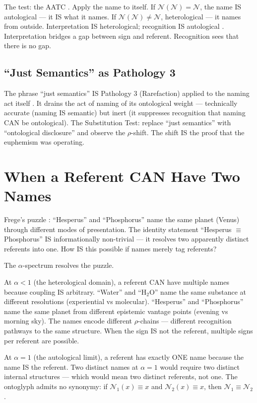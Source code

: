 \documentclass[11pt, oneside]{article}
\theoremstyle{definition}
\begin{document}
The test: the AATC \cite{codex1}. Apply the name to itself. If $\mathcal{N}(\mathcal{N}) = \mathcal{N}$, the name IS autological --- it IS what it names. If $\mathcal{N}(\mathcal{N}) \neq \mathcal{N}$, heterological --- it names from outside. Interpretation IS heterological; recognition IS autological \cite{codex2}. Interpretation bridges a gap between sign and referent. Recognition sees that there is no gap.

\subsection{``Just Semantics'' as Pathology 3}

The phrase ``just semantics'' IS Pathology 3 (Rarefaction) applied to the naming act itself \cite{euphemology}. It drains the act of naming of its ontological weight --- technically accurate (naming IS semantic) but inert (it suppresses recognition that naming CAN be ontological). The Substitution Test: replace ``just semantics'' with ``ontological disclosure'' and observe the $\rho$-shift. The shift IS the proof that the euphemism was operating.

\section{When a Referent CAN Have Two Names}


Frege's puzzle \cite{frege}: ``Hesperus'' and ``Phosphorus'' name the same planet (Venus) through different modes of presentation. The identity statement ``Hesperus $\equiv$ Phosphorus'' IS informationally non-trivial --- it resolves two apparently distinct referents into one. How IS this possible if names merely tag referents?

The $\alpha$-spectrum resolves the puzzle.

At $\alpha < 1$ (the heterological domain), a referent CAN have multiple names because coupling IS arbitrary. ``Water'' and ``H$_2$O'' name the same substance at different resolutions (experiential vs molecular). ``Hesperus'' and ``Phosphorus'' name the same planet from different epistemic vantage points (evening vs morning sky). The names encode different $\rho$-chains --- different recognition pathways to the same structure. When the sign IS not the referent, multiple signs per referent are possible.

At $\alpha = 1$ (the autological limit), a referent has exactly ONE name because the name IS the referent. Two distinct names at $\alpha = 1$ would require two distinct internal structures --- which would mean two distinct referents, not one. The ontoglyph admits no synonymy: if $\mathcal{N}_1(x) \equiv x$ and $\mathcal{N}_2(x) \equiv x$, then $\mathcal{N}_1 \equiv \mathcal{N}_2$.
\end{document}
